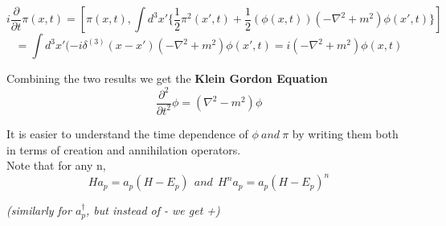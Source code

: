 \documentclass{article}
\newcommand{\A}{a^\dagger}
\begin{document}
\begin{equation}
    i\frac{\partial}{\partial t}\pi(x,t) =[\pi(x,t),\int d^3x' \{ \frac{1}{2} \pi^2(x',t) + \frac{1}{2}(\phi(x,t))(-\nabla^2 +m^2)\phi(x',t)\}]
\end{equation}
\begin{equation*}
    = \int d^3x'(-i\delta^{(3)}(x-x')(-\nabla^2 +m^2)\phi(x',t)=i(-\nabla^2 +m^2)\phi(x,t)
\end{equation*}

Combining the two results we get the \textbf{Klein Gordon Equation}
\begin{equation}
    \frac{\partial^2}{\partial t^2}\phi = (\nabla^2 - m^2)\phi
\end{equation}


It is easier to understand the time dependence of $\phi\ and\ \pi$ by writing them both in terms of creation and annihilation operators.
\\

Note that for any n,
\begin{equation*}
    Ha_p = a_p(H-E_p)\ \ and\  \ H^n a_p = a_p(H-E_p)^n
\end{equation*}

\textit{(similarly for $\A_p$, but instead of - we get +)}
\end{document}
